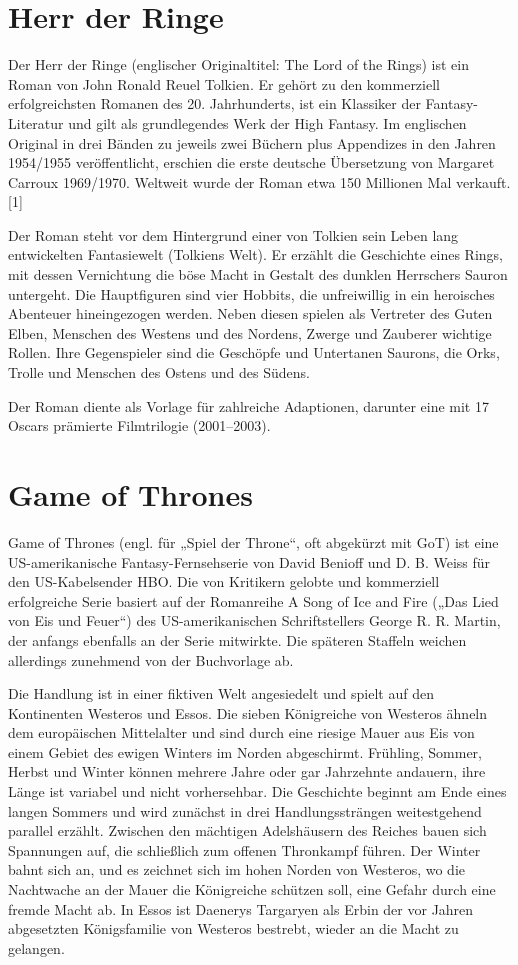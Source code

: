 \documentclass{article}
\begin{document}
\newpage  
\section {Herr der Ringe}  
Der Herr der Ringe (englischer Originaltitel: The Lord of the Rings) ist ein Roman von John Ronald Reuel Tolkien. Er gehört zu den kommerziell erfolgreichsten Romanen des 20. Jahrhunderts, ist ein Klassiker der Fantasy-Literatur und gilt als grundlegendes Werk der High Fantasy. Im englischen Original in drei Bänden zu jeweils zwei Büchern plus Appendizes in den Jahren 1954/1955 veröffentlicht, erschien die erste deutsche Übersetzung von Margaret Carroux 1969/1970. Weltweit wurde der Roman etwa 150 Millionen Mal verkauft.[1]  
  
Der Roman steht vor dem Hintergrund einer von Tolkien sein Leben lang entwickelten Fantasiewelt (Tolkiens Welt). Er erzählt die Geschichte eines Rings, mit dessen Vernichtung die böse Macht in Gestalt des dunklen Herrschers Sauron untergeht. Die Hauptfiguren sind vier Hobbits, die unfreiwillig in ein heroisches Abenteuer hineingezogen werden. Neben diesen spielen als Vertreter des Guten Elben, Menschen des Westens und des Nordens, Zwerge und Zauberer wichtige Rollen. Ihre Gegenspieler sind die Geschöpfe und Untertanen Saurons, die Orks, Trolle und Menschen des Ostens und des Südens.  
  
Der Roman diente als Vorlage für zahlreiche Adaptionen, darunter eine mit 17 Oscars prämierte Filmtrilogie (2001–2003).  
  
\newpage  
\section {Game of Thrones}  
Game of Thrones (engl. für „Spiel der Throne“, oft abgekürzt mit GoT) ist eine US-amerikanische Fantasy-Fernsehserie von David Benioff und D. B. Weiss für den US-Kabelsender HBO. Die von Kritikern gelobte und kommerziell erfolgreiche Serie basiert auf der Romanreihe A Song of Ice and Fire („Das Lied von Eis und Feuer“) des US-amerikanischen Schriftstellers George R. R. Martin, der anfangs ebenfalls an der Serie mitwirkte. Die späteren Staffeln weichen allerdings zunehmend von der Buchvorlage ab.  
  
Die Handlung ist in einer fiktiven Welt angesiedelt und spielt auf den Kontinenten Westeros und Essos. Die sieben Königreiche von Westeros ähneln dem europäischen Mittelalter und sind durch eine riesige Mauer aus Eis von einem Gebiet des ewigen Winters im Norden abgeschirmt. Frühling, Sommer, Herbst und Winter können mehrere Jahre oder gar Jahrzehnte andauern, ihre Länge ist variabel und nicht vorhersehbar. Die Geschichte beginnt am Ende eines langen Sommers und wird zunächst in drei Handlungssträngen weitestgehend parallel erzählt. Zwischen den mächtigen Adelshäusern des Reiches bauen sich Spannungen auf, die schließlich zum offenen Thronkampf führen. Der Winter bahnt sich an, und es zeichnet sich im hohen Norden von Westeros, wo die Nachtwache an der Mauer die Königreiche schützen soll, eine Gefahr durch eine fremde Macht ab. In Essos ist Daenerys Targaryen als Erbin der vor Jahren abgesetzten Königsfamilie von Westeros bestrebt, wieder an die Macht zu gelangen.  
  
\end{document}
